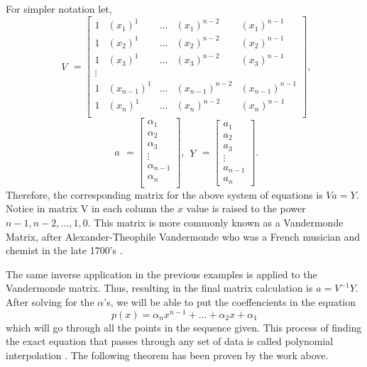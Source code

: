 \documentclass[12pt]{amsart}
\begin{document}
For simpler notation let,
\begin{equation*}
\begin{array}{c}
V
\end{array}=
\left[ {\begin{array}{ccccc}
1& (x_1)^1 &\hdots& (x_1)^{n-2} & (x_1)^{n-1} \\
1& (x_2)^1 &\hdots& (x_2)^{n-2} & (x_2)^{n-1} \\
1& (x_3)^1 &\hdots& (x_3)^{n-2} & (x_3)^{n-1} \\
\vdots\\
1&(x_{n-1})^1&\hdots& (x_{n-1})^{n-2} & (x_{n-1})^{n-1}\\
1&(x_{n})^1&\hdots& (x_{n})^{n-2} & (x_{n})^{n-1}\\
 
\end{array} } \right],
\end{equation*}
\begin{equation*}
\begin{array}{c}
a
\end{array}=
\left[ {\begin{array}{c}
\alpha_1 \\
\alpha_2 \\
\alpha_3 \\
\vdots\\
\alpha_{n-1} \\
\alpha_n \\
 
 
\end{array} } \right],
\begin{array}{c}
Y
\end{array}=
\left[ {\begin{array}{c}
a_1 \\
a_2 \\
a_3\\
\vdots\\
a_{n-1}\\
a_n
\end{array} } \right].
\end{equation*}
Therefore, the corresponding matrix for the above system of equations is $Va=Y$.
Notice in matrix V in each column the $x$ value is raised to the power $n-1, n-2,\hdots,1, 0$. This matrix is more commonly known as a Vandermonde Matrix, after Alexander-Theophile Vandermonde who was a French musician and chemist in the late 1700's \cite{Klinger}.
 
The same inverse application in the previous examples is applied to the Vandermonde matrix. Thus, resulting in the final matrix calculation is $a=V^{-1}Y$.
After solving for the $\alpha$'s, we will be able to put the coeffencients in the equation
\begin{equation*}
p(x)=\alpha_{n}x^{n-1}+\hdots+\alpha_2x+\alpha_1
\end{equation*}
which will go through all the points in the sequence given. This process of finding the exact equation that passes through any set of data is called polynomial interpolation \cite{Walsh}.
The following theorem has been proven by the work above.
 
\end{document}
